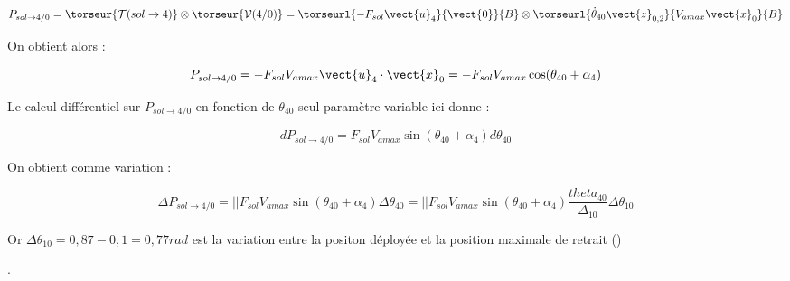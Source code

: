 \documentclass[11pt]{article}
\begin{document}
\begin{UPSTIcorrige}

\begin{align*}
P_{sol\to 4/0}=\torseur{\mathcal{T} (sol \to 4)}\otimes \torseur{\mathcal{V} (4/0)}=\torseurl{-F_{sol}\vect{u}_4}{\vect{0}}{B}\otimes \torseurl{\dot{\theta}_{40}\vect{z}_{0,2}}{V_{a max}\vect{x}_0}{B}
\end{align*}

On obtient alors : 

$$
P_{sol\to 4/0}=-F_{sol}V_{a max}\vect{u}_4\cdot \vect{x}_0=-F_{sol}V_{a max}\cos(\theta_{40}+\alpha_4)
$$

Le calcul différentiel sur $P_{sol\to 4/0}$ en fonction de $\theta_{40}$ seul paramètre variable ici donne : 

$$
dP_{sol\to 4/0}=F_{sol}V_{a max}\sin (\theta_{40}+\alpha_4)d\theta_{40}
$$

On obtient comme variation : 

$$
\Delta P_{sol\to 4/0}=\vert \vert F_{sol}V_{a max}\sin (\theta_{40}+\alpha_4) \Delta \theta_{40}=\vert \vert F_{sol}V_{a max}\sin (\theta_{40}+\alpha_4)\dfrac{theta_{40}}{\Delta_{10}} \Delta \theta_{10}
$$

Or $\Delta \theta_{10}=0,87-0,1=0,77rad$ est la variation entre la positon déployée et la position maximale de retrait ()
\end{UPSTIcorrige}

.

\end{document}
